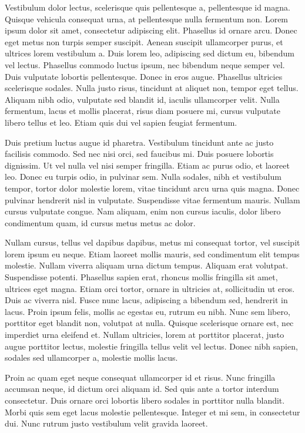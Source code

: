 \documentclass[a4paper]{article}
\begin{document}
Vestibulum dolor lectus, scelerisque quis pellentesque a, pellentesque id magna. Quisque vehicula consequat urna, at pellentesque nulla fermentum non. Lorem ipsum dolor sit amet, consectetur adipiscing elit. Phasellus id ornare arcu. Donec eget metus non turpis semper suscipit. Aenean suscipit ullamcorper purus, et ultrices lorem vestibulum a. Duis lorem leo, adipiscing sed dictum eu, bibendum vel lectus. Phasellus commodo luctus ipsum, nec bibendum neque semper vel. Duis vulputate lobortis pellentesque. Donec in eros augue. Phasellus ultricies scelerisque sodales. Nulla justo risus, tincidunt at aliquet non, tempor eget tellus. Aliquam nibh odio, vulputate sed blandit id, iaculis ullamcorper velit. Nulla fermentum, lacus et mollis placerat, risus diam posuere mi, cursus vulputate libero tellus et leo. Etiam quis dui vel sapien feugiat fermentum.

Duis pretium luctus augue id pharetra. Vestibulum tincidunt ante ac justo facilisis commodo. Sed nec nisi orci, sed faucibus mi. Duis posuere lobortis dignissim. Ut vel nulla vel nisi semper fringilla. Etiam ac purus odio, et laoreet leo. Donec eu turpis odio, in pulvinar sem. Nulla sodales, nibh et vestibulum tempor, tortor dolor molestie lorem, vitae tincidunt arcu urna quis magna. Donec pulvinar hendrerit nisl in vulputate. Suspendisse vitae fermentum mauris. Nullam cursus vulputate congue. Nam aliquam, enim non cursus iaculis, dolor libero condimentum quam, id cursus metus metus ac dolor.

Nullam cursus, tellus vel dapibus dapibus, metus mi consequat tortor, vel suscipit lorem ipsum eu neque. Etiam laoreet mollis mauris, sed condimentum elit tempus molestie. Nullam viverra aliquam urna dictum tempus. Aliquam erat volutpat. Suspendisse potenti. Phasellus sapien erat, rhoncus mollis fringilla sit amet, ultrices eget magna. Etiam orci tortor, ornare in ultricies at, sollicitudin ut eros. Duis ac viverra nisl. Fusce nunc lacus, adipiscing a bibendum sed, hendrerit in lacus. Proin ipsum felis, mollis ac egestas eu, rutrum eu nibh. Nunc sem libero, porttitor eget blandit non, volutpat at nulla. Quisque scelerisque ornare est, nec imperdiet urna eleifend et. Nullam ultricies, lorem at porttitor placerat, justo augue porttitor lectus, molestie fringilla tellus velit vel lectus. Donec nibh sapien, sodales sed ullamcorper a, molestie mollis lacus.

Proin ac quam eget neque consequat ullamcorper id et risus. Nunc fringilla accumsan neque, id dictum orci aliquam id. Sed quis ante a tortor interdum consectetur. Duis ornare orci lobortis libero sodales in porttitor nulla blandit. Morbi quis sem eget lacus molestie pellentesque. Integer et mi sem, in consectetur dui. Nunc rutrum justo vestibulum velit gravida laoreet.
\end{document}
